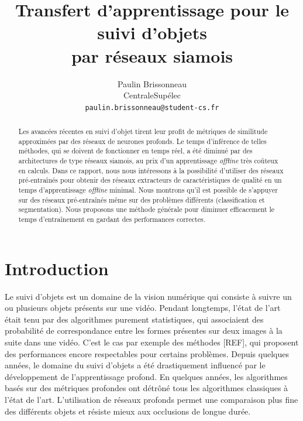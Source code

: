 \documentclass[10pt,twocolumn,letterpaper,french]{article}
\begin{document}
\title{Transfert d'apprentissage pour le suivi d'objets\\par réseaux siamois}

\author{Paulin Brissonneau\\
CentraleSupélec\\
{\tt\small paulin.brissonneau@student-cs.fr}}



\maketitle

\begin{abstract}

Les avancées récentes en suivi d'objet tirent leur profit de métriques de similitude approximées par des réseaux de neurones profonds. Le temps d'inférence de telles méthodes, qui se doivent de fonctionner en temps réel, a été diminué par des architectures de type réseaux siamois, au prix d'un apprentissage \textit{offline} très coûteux en calculs. Dans ce rapport, nous nous intéressons à la possibilité d'utiliser des réseaux pré-entraînés pour obtenir des réseaux extracteurs de caractéristiques de qualité en un temps d'apprentissage \textit{offline} minimal. Nous montrons qu'il est possible de s'appuyer sur des réseaux pré-entraînés même sur des problèmes différents (classification et segmentation). Nous proposons une méthode générale pour diminuer efficacement le temps d’entraînement en gardant des performances correctes.
 
\end{abstract}

\section*{Introduction}

Le suivi d'objets est un domaine de la vision numérique qui consiste à suivre un ou plusieurs objets présents sur une vidéo.
   Pendant longtemps, l'état de l'art était tenu par des algorithmes purement statistiques, qui associaient des probabilité de correspondance entre les formes présentes sur deux images à la suite dans une vidéo. C'est le cas par exemple des méthodes [REF], qui proposent des performances encore respectables pour certains problèmes.
   Depuis quelques années, le domaine du suivi d'objets a été drastiquement influencé par le développement de l'apprentissage profond. En quelques années, les algorithmes basés sur des métriques profondes ont détrôné tous les algorithmes classiques à l'état de l'art. L'utilisation de réseaux profonds permet une comparaison plus fine des différents objets et résiste mieux aux occlusions de longue durée. \\
   
\end{document}
